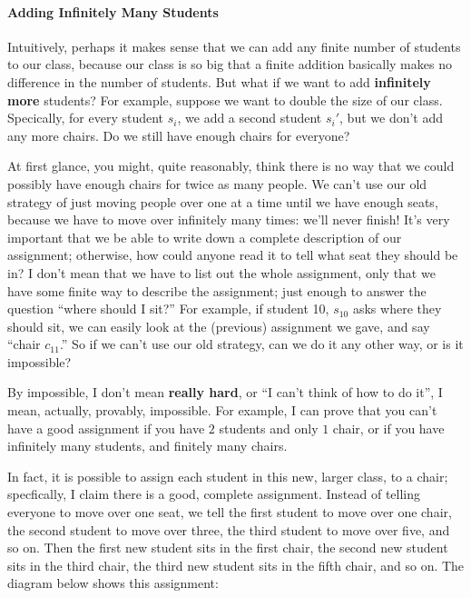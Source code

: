 \paragraph{Adding Infinitely Many Students}
Intuitively, perhaps it makes sense that we can add any finite number of students to our class, because our class is so big that a finite addition basically makes no difference in the number of students.
But what if we want to add \textbf{infinitely more} students? For example, suppose we want to double the size of our class.
Specically, for every student $s_i$, we add a second student $s_{i}'$, but we don't add any more chairs.
Do we still have enough chairs for everyone?

At first glance, you might, quite reasonably, think there is no way that we could possibly have enough chairs for twice as many people.
We can't use our old strategy of just moving people over one at a time until we have enough seats, because we have to move over infinitely many times: we'll never finish!
It's very important that we be able to write down a complete description of our assignment; otherwise, how could anyone read it to tell what seat they should be in?
I don't mean that we have to list out the whole assignment, only that we have some finite way to describe the assignment; just enough to answer the question ``where should I sit?''
For example, if student 10, $s_{10}$ asks where they should sit, we can easily look at the (previous) assignment we gave, and say ``chair $c_{11}$.''
So if we can't use our old strategy, can we do it any other way, or is it impossible?

By impossible, I don't mean \textbf{really hard}, or ``I can't think of how to do it'', I mean, actually, provably, impossible.
For example, I can prove that you can't have a good assignment if you have $2$ students and only $1$ chair, or if you have infinitely many students, and finitely many chairs. 

In fact, it is possible to assign each student in this new, larger class, to a chair; specfically, I claim there is a good, complete assignment.
Instead of telling everyone to move over one seat, we tell the first student to move over one chair, the second student to move over three, the third student to move over five, and so on.
Then the first new student sits in the first chair, the second new student sits in the third chair, the third new student sits in the fifth chair, and so on.
The diagram below shows this assignment:

